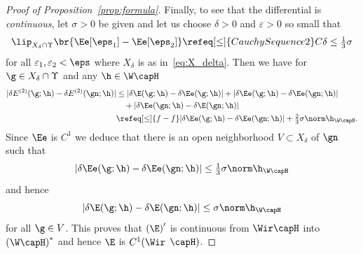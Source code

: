 \begin{proof}[Proof of Proposition~\ref{prop:formula}]
Finally, to see that the differential is \emph{continuous}, let $\sigma >0$ be given and let us choose
$\delta>0$ and $\varepsilon>0$ so small that
\begin{equation*}
 \lip_{X_\delta\cap\Upsilon}\br{\Ee[\eps_1]-\Ee[\eps_2]} \refeq[\le]{CauchySequence2} C \delta \leq \tfrac13 \sigma
\end{equation*}
for all $\varepsilon_1, \varepsilon_2 < \eps$ where $X_\delta$ is as in~\eqref{eq:X_delta}. Then we
have for $\g \in X_\delta \cap\Upsilon$ and any $\h\in\W\capH$
\begin{align*}
 |\delta E^{(2)}(\g;\h) - \delta E^{(2)}(\gn;\h)|
 &\leq |\delta \E(\g;\h) - \delta \Ee(\g;\h)| + 
  |\delta \Ee(\g;\h) - \delta \Ee(\gn;\h)| 
 \\ 
  &\quad + |\delta \Ee(\gn;\h) - \delta \E(\gn;\h)|
 \\
  &\refeq[\le]{f-f}  |\delta \Ee(\g;\h) - \delta \Ee(\gn;\h)| +  \tfrac23 \sigma \norm\h_{\W\capH}.
\end{align*} 
Since $\Ee$ is $C^1$ we deduce that there is an open neighborhood $V\subset X_\delta$
of $\gn$ such that 
\begin{equation*}
 |\delta \Ee(\g;\h) - \delta \Ee(\gn;\h)| \leq \tfrac13\sigma \norm\h_{\W\capH}
\end{equation*}
and hence
\begin{equation*}
  |\delta \E(\g;\h) - \delta \E(\gn;\h)| \leq \sigma \norm\h_{\W\capH}
\end{equation*}
for all $\g\in V$.
This proves that $\left(\E \right)'$ is continuous from $\Wir\capH$ into $\left( \W \capH \right)^\ast$ and
hence $\E$ is $C^1(\Wir$ $\capH)$.
\end{proof}


